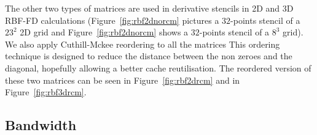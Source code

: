 \documentclass[10pt,conference,compsocconf]{IEEEtran}
\begin{document}
The other two types of matrices are used in derivative stencils in 2D
and 3D RBF-FD calculations (Figure~\ref{fig:rbf2dnorcm} pictures a
$32$-points stencil of a $23^2$ 2D grid and
Figure~\ref{fig:rbf2dnorcm} shows a $32$-points stencil of a $8^3$
grid). We also apply Cuthill-Mckee reordering to all the matrices This
ordering technique is designed to reduce the distance between the non
zeroes and the diagonal, hopefully allowing a better cache
reutilisation. The reordered version of these two matrices can be seen
in Figure~\ref{fig:rbf2drcm} and in Figure~\ref{fig:rbf3drcm}.


\subsection{Bandwidth}

\begin{figure}
\centering
%
   \\


\end{figure}
\end{document}

